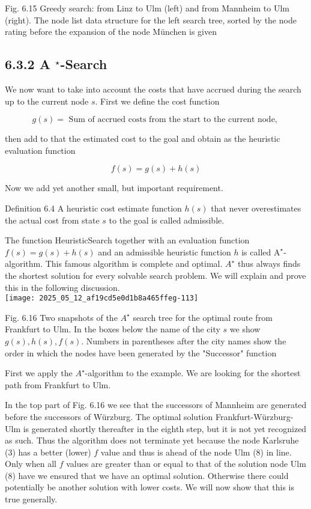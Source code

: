 \documentclass[10pt]{article}
\begin{document}
Fig. 6.15 Greedy search: from Linz to Ulm (left) and from Mannheim to Ulm (right). The node list data structure for the left search tree, sorted by the node rating before the expansion of the node München is given

\subsection*{6.3.2 A ${ }^{\star}$-Search}
We now want to take into account the costs that have accrued during the search up to the current node $s$. First we define the cost function

$$
g(s)=\text { Sum of accrued costs from the start to the current node, }
$$

then add to that the estimated cost to the goal and obtain as the heuristic evaluation function

$$
f(s)=g(s)+h(s)
$$

Now we add yet another small, but important requirement.

Definition 6.4 A heuristic cost estimate function $h(s)$ that never overestimates the actual cost from state $s$ to the goal is called admissible.

The function HeuristicSearch together with an evaluation function $f(s)=g(s)+h(s)$ and an admissible heuristic function $h$ is called $\mathrm{A}^{\star}$-algorithm. This famous algorithm is complete and optimal. $A^{\star}$ thus always finds the shortest solution for every solvable search problem. We will explain and prove this in the following discussion.\\
\texttt{[image: 2025\_05\_12\_af19cd5e0d1b8a465ffeg-113]}

Fig. 6.16 Two snapshots of the $A^{\star}$ search tree for the optimal route from Frankfurt to Ulm. In the boxes below the name of the city $s$ we show $g(s), h(s), f(s)$. Numbers in parentheses after the city names show the order in which the nodes have been generated by the "Successor" function

First we apply the $A^{\star}$-algorithm to the example. We are looking for the shortest path from Frankfurt to Ulm.

In the top part of Fig. 6.16 we see that the successors of Mannheim are generated before the successors of Würzburg. The optimal solution Frankfurt-Würzburg-Ulm is generated shortly thereafter in the eighth step, but it is not yet recognized as such. Thus the algorithm does not terminate yet because the node Karlsruhe (3) has a better (lower) $f$ value and thus is ahead of the node Ulm (8) in line. Only when all $f$ values are greater than or equal to that of the solution node Ulm (8) have we ensured that we have an optimal solution. Otherwise there could potentially be another solution with lower costs. We will now show that this is true generally.
\end{document}
